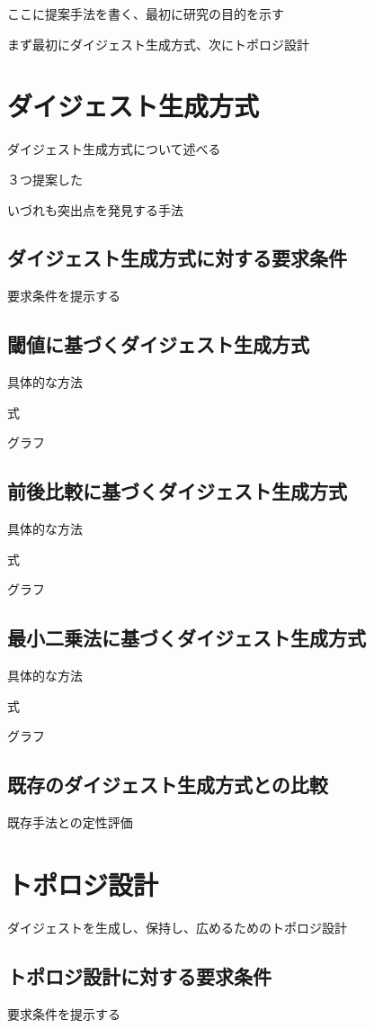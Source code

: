 ここに提案手法を書く、最初に研究の目的を示す

まず最初にダイジェスト生成方式、次にトポロジ設計
\section{ダイジェスト生成方式}
ダイジェスト生成方式について述べる

３つ提案した

いづれも突出点を発見する手法

\subsection{ダイジェスト生成方式に対する要求条件}
要求条件を提示する

\subsection{閾値に基づくダイジェスト生成方式}
具体的な方法

式

グラフ

\subsection{前後比較に基づくダイジェスト生成方式}
具体的な方法

式

グラフ


\subsection{最小二乗法に基づくダイジェスト生成方式}
具体的な方法

式

グラフ

\subsection{既存のダイジェスト生成方式との比較}

既存手法との定性評価

\section{トポロジ設計}
ダイジェストを生成し、保持し、広めるためのトポロジ設計

\subsection{トポロジ設計に対する要求条件}
要求条件を提示する


